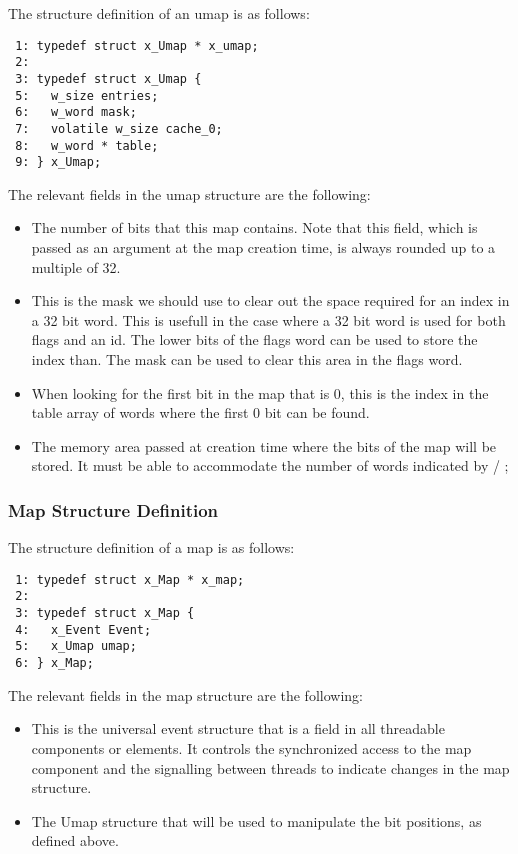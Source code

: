The structure definition of an umap is as follows:

\bcode
\begin{verbatim}
 1: typedef struct x_Umap * x_umap;
 2:
 3: typedef struct x_Umap {
 5:   w_size entries;
 6:   w_word mask;
 7:   volatile w_size cache_0;
 8:   w_word * table;
 9: } x_Umap;
\end{verbatim}
\ecode

The relevant fields in the umap structure are the following:

\begin{itemize}
\item {} The number of bits that this map
contains. Note that this field, which is passed as an argument at the map
creation time, is always rounded up to a multiple of 32.
\item {} This is the mask we should use to
clear out the space required for an index in a 32 bit word. This is usefull
in the case where a 32 bit word is used for both flags and an id. The lower
bits of the flags word can be used to store the index than. The mask can be
used to clear this area in the flags word.
\item {} When looking for the first bit in
the map that is 0, this is the index in the table array of words where the
first 0 bit can be found.
\item {} The memory area passed at creation
time where the bits of the map will be stored. It must be able to accommodate
the number of words indicated by  /
;
\end{itemize}

\subsubsection{Map Structure Definition}

The structure definition of a map is as follows:

\bcode
\begin{verbatim}
 1: typedef struct x_Map * x_map;
 2:
 3: typedef struct x_Map {
 4:   x_Event Event;
 5:   x_Umap umap;
 6: } x_Map;
\end{verbatim}
\ecode

The relevant fields in the map structure are the following:

\begin{itemize}
\item {} This is the universal event structure that is a field
in all threadable components or elements. It controls the synchronized access
to the map component and the signalling between threads to indicate changes
in the map structure.
\item {} The Umap structure that will be used
to manipulate the bit positions, as defined above.
\end{itemize}

